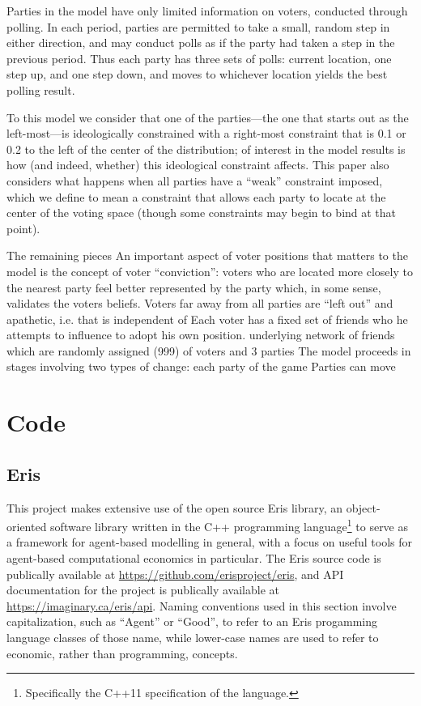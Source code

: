 \documentclass[12pt]{article}
\numberwithin{equation}{subsection}
\begin{document}
Parties in the model have only limited information on voters, conducted through polling.  In each
period, parties are permitted to take a small, random step in either direction, and may conduct
polls as if the party had taken a step in the previous period.  Thus each party has three sets of
polls: current location, one step up, and one step down, and moves to whichever location yields the
best polling result.

To this model we consider that one of the parties---the one that starts out as the left-most---is
ideologically constrained with a right-most constraint that is 0.1 or 0.2 to the left of the center
of the distribution; of interest in the model results is how (and indeed, whether) this ideological
constraint affects.  This paper also considers what happens when all parties have a ``weak''
constraint imposed, which we define to mean a constraint that allows each party to locate at
the center of the voting space (though some constraints may begin to bind at that point).

The remaining pieces 
An important aspect of voter positions that matters to the model is the concept of voter
``conviction'': voters who are located more closely to the nearest party feel better represented by
the party which, in some sense, validates the voters beliefs.  Voters far away from all parties are
``left out'' and apathetic, i.e. 
that is independent of  Each voter has a fixed set of friends who he
attempts to influence to adopt his own position.   underlying network of friends which
are randomly assigned
(999) of voters and 3 parties The model proceeds in stages involving two types of change: each party of the game Parties can move 


\section{Code}\label{s:code}

\subsection{Eris}\label{s:code:eris}

This project makes extensive use of the open source Eris library, an object-oriented software
library written in the C++ programming language\footnote{Specifically the C++11 specification of the
language.} to serve as a framework for agent-based modelling in general, with a focus on useful
tools for agent-based computational economics in particular.  The Eris source code is publically
available at \url{https://github.com/erisproject/eris}, and API documentation for the project is
publically available at \url{https://imaginary.ca/eris/api}.  Naming conventions used in this
section involve capitalization, such as ``Agent'' or ``Good'', to refer to an Eris progamming
language classes of those name, while lower-case names are used to refer to economic, rather than
programming, concepts.
\end{document}
